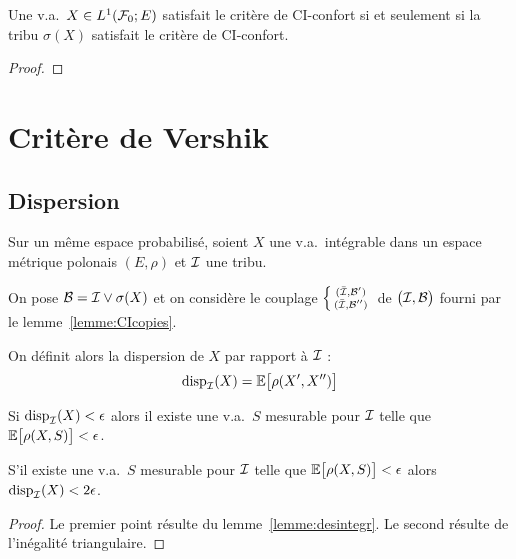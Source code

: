 \documentclass[12pt,a4paper]{article}
\begin{document}
\begin{ppsition}\label{ppsition:CItribu}
Une v.a.\ $X \in L^1(\mathcal{F}_0; E)$ satisfait le critère de CI-confort si 
et seulement si la tribu $\sigma(X)$ satisfait le critère de CI-confort. 
\end{ppsition}

\begin{proof}

\end{proof}

\section{Critère de Vershik}

\subsection{Dispersion}

Sur un m\^eme espace probabilisé, soient $X$ une v.a.\ intégrable 
dans un espace métrique polonais $(E,\rho)$ et $\mathcal{I}$ une tribu. 

On pose $\mathcal{B}= \mathcal{I} \vee \sigma(X)$ et on considère le couplage 
 $\left\{\begin{smallmatrix} 
(\bar {\mathcal{I}}, \mathcal{B}')
\\ 
(\bar {\mathcal{I}}, \mathcal{B}'')
\end{smallmatrix}\right.$ 
de $\bigl(\mathcal{I}, \mathcal{B}\bigr)$ fourni par le lemme~\ref{lemme:CIcopies}. 

On définit alors la dispersion de $X$ par rapport à $\mathcal{I}$ :
$$
\textrm{disp}_{\mathcal{I}}(X) = \mathbb{E}\bigl[\rho(X', X'') \bigr]
$$

\begin{lemme}\label{lemme:dispersion}
Si $\textrm{disp}_{\mathcal{I}}(X) < \epsilon$ alors il existe une v.a.\ $S$ mesurable pour $\mathcal{I}$ 
telle que  $\mathbb{E}\bigl[\rho(X, S) \bigr] < \epsilon$. 

S'il existe  une v.a.\ $S$ mesurable pour $\mathcal{I}$ 
telle que  $\mathbb{E}\bigl[\rho(X, S) \bigr] < \epsilon$ alors 
 $\textrm{disp}_{\mathcal{I}}(X) < 2\epsilon$.
\end{lemme}

\begin{proof}
Le premier point résulte du lemme~\ref{lemme:desintegr}. 
Le second résulte de l'inégalité triangulaire. 
\end{proof}
\end{document}
